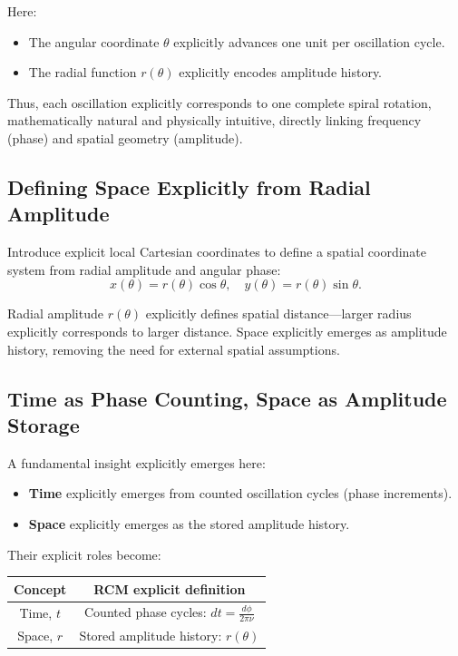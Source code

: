 Here:
\begin{itemize}
    \item The angular coordinate $\theta$ explicitly advances one unit per oscillation cycle.
    \item The radial function $r(\theta)$ explicitly encodes amplitude history.
\end{itemize}

Thus, each oscillation explicitly corresponds to one complete spiral rotation, mathematically natural and physically intuitive, directly linking frequency (phase) and spatial geometry (amplitude).

\subsection{Defining Space Explicitly from Radial Amplitude}

Introduce explicit local Cartesian coordinates to define a spatial coordinate system from radial amplitude and angular phase:
\begin{equation}
    x(\theta)=r(\theta)\cos\theta,\quad y(\theta)=r(\theta)\sin\theta.
\end{equation}

Radial amplitude $r(\theta)$ explicitly defines spatial distance—larger radius explicitly corresponds to larger distance. Space explicitly emerges as amplitude history, removing the need for external spatial assumptions.

\subsection{Time as Phase Counting, Space as Amplitude Storage}

A fundamental insight explicitly emerges here:
\begin{itemize}
    \item \textbf{Time} explicitly emerges from counted oscillation cycles (phase increments).
    \item \textbf{Space} explicitly emerges as the stored amplitude history.
\end{itemize}

Their explicit roles become:
\begin{center}
\begin{tabular}{|c|c|}
\hline
\textbf{Concept} & \textbf{RCM explicit definition} \\ \hline
Time, $t$  & Counted phase cycles: $dt=\frac{d\phi}{2\pi\nu}$ \\ \hline
Space, $r$ & Stored amplitude history: $r(\theta)$ \\ \hline
\end{tabular}
\end{center}

